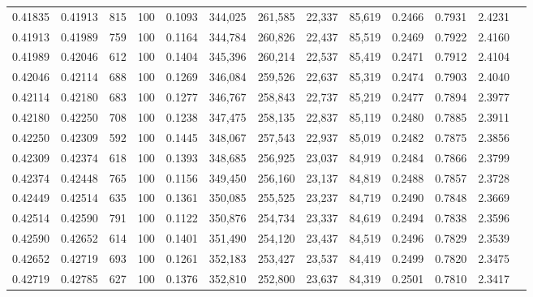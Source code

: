 \begin{tabular}{rrrrrrrrrrrrr}
0.41835 & 0.41913 &   815 & 100 &                                     0.1093 & 344,025 & 261,585 &  22,337 &  85,619 & 0.2466 & 0.7931 & 2.4231 \\
0.41913 & 0.41989 &   759 & 100 &                                     0.1164 & 344,784 & 260,826 &  22,437 &  85,519 & 0.2469 & 0.7922 & 2.4160 \\
0.41989 & 0.42046 &   612 & 100 &                                     0.1404 & 345,396 & 260,214 &  22,537 &  85,419 & 0.2471 & 0.7912 & 2.4104 \\
0.42046 & 0.42114 &   688 & 100 &                                     0.1269 & 346,084 & 259,526 &  22,637 &  85,319 & 0.2474 & 0.7903 & 2.4040 \\
0.42114 & 0.42180 &   683 & 100 &                                     0.1277 & 346,767 & 258,843 &  22,737 &  85,219 & 0.2477 & 0.7894 & 2.3977 \\
0.42180 & 0.42250 &   708 & 100 &                                     0.1238 & 347,475 & 258,135 &  22,837 &  85,119 & 0.2480 & 0.7885 & 2.3911 \\
0.42250 & 0.42309 &   592 & 100 &                                     0.1445 & 348,067 & 257,543 &  22,937 &  85,019 & 0.2482 & 0.7875 & 2.3856 \\
0.42309 & 0.42374 &   618 & 100 &                                     0.1393 & 348,685 & 256,925 &  23,037 &  84,919 & 0.2484 & 0.7866 & 2.3799 \\
0.42374 & 0.42448 &   765 & 100 &                                     0.1156 & 349,450 & 256,160 &  23,137 &  84,819 & 0.2488 & 0.7857 & 2.3728 \\
0.42449 & 0.42514 &   635 & 100 &                                     0.1361 & 350,085 & 255,525 &  23,237 &  84,719 & 0.2490 & 0.7848 & 2.3669 \\
0.42514 & 0.42590 &   791 & 100 &                                     0.1122 & 350,876 & 254,734 &  23,337 &  84,619 & 0.2494 & 0.7838 & 2.3596 \\
0.42590 & 0.42652 &   614 & 100 &                                     0.1401 & 351,490 & 254,120 &  23,437 &  84,519 & 0.2496 & 0.7829 & 2.3539 \\
0.42652 & 0.42719 &   693 & 100 &                                     0.1261 & 352,183 & 253,427 &  23,537 &  84,419 & 0.2499 & 0.7820 & 2.3475 \\
0.42719 & 0.42785 &   627 & 100 &                                     0.1376 & 352,810 & 252,800 &  23,637 &  84,319 & 0.2501 & 0.7810 & 2.3417 \\

\end{tabular}
